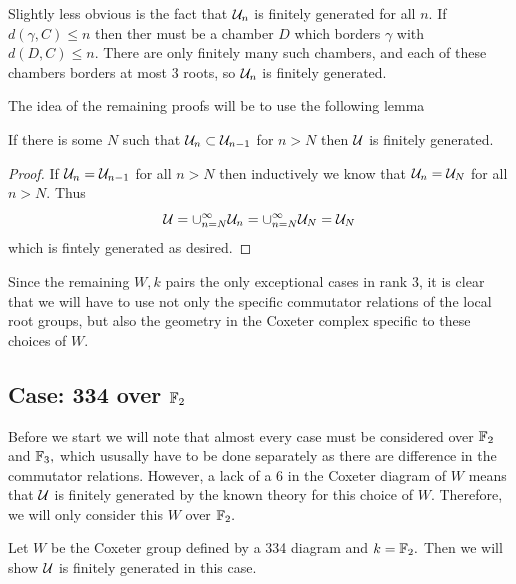 \documentclass[class=book, crop=false]{standalone}
\begin{document}
Slightly less obvious is the fact that $\mathcal{U}_n$ is finitely generated for all $n.$ If $d(\gamma,C)\le n$ then ther must be a chamber $D$ which borders $\gamma$ with $d(D,C)\le n.$ There are only finitely many such chambers, and each of these chambers borders at most 3 roots, so $\mathcal{U}_n$ is finitely generated.

The idea of the remaining proofs will be to use the following lemma
\begin{lemma} If there is some $N$ such that $\mathcal{U}_n\subset \mathcal{U}_{n-1}$ for $n>N$ then $\mathcal{U}$ is finitely generated.
	\label{fgcond}
\end{lemma}
\begin{proof}
	If $\mathcal{U}_n=\mathcal{U}_{n-1}$ for all $n> N$ then inductively we know that $\mathcal{U}_n=\mathcal{U}_N$ for all $n>N.$ Thus
	\[
		\mathcal{U}=\cup_{n=N}^{\infty}{\mathcal{U}_n}=\cup_{n=N}^\infty \mathcal{U}_N=\mathcal{U}_N
	\]
	which is fintely generated as desired.
\end{proof}

Since the remaining $W,k$ pairs the only exceptional cases in rank 3, it is clear that we will have to use not only the specific commutator relations of the local root groups, but also the geometry in the Coxeter complex specific to these choices of $W.$

\subsection{Case: 334 over $\mathbb{F}_{2}$}
Before we start we will note that almost every case must be considered over $\mathbb{F}_{2}$ and $\mathbb{F}_{3},$ which ususally have to be done separately as there are difference in the commutator relations. However, a lack of a $6$ in the Coxeter diagram of $W$ means that $\mathcal{U}$ is finitely generated by the known theory for this choice of $W.$ Therefore, we will only consider this $W$ over $\mathbb{F}_{2}.$

Let $W$ be the Coxeter group defined by a 334 diagram and $k=\mathbb{F}_{2}.$ Then we will show $\mathcal{U}$ is finitely generated in this case.
\end{document}
